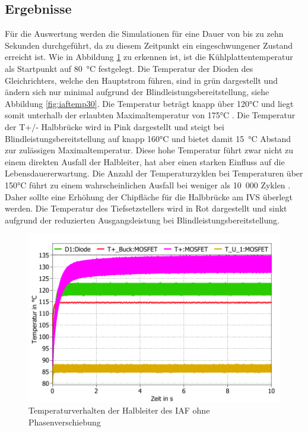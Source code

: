 		\subsection{Ergebnisse}
		Für die Auswertung werden die Simulationen für eine Dauer von bis zu zehn Sekunden durchgeführt, da zu diesem Zeitpunkt ein eingeschwungener Zustand erreicht ist. Wie in Abbildung \ref{fig:iaftemp0} zu erkennen ist, ist die Kühlplattentemperatur als Startpunkt auf 80~°C festgelegt. Die Temperatur der Dioden des Gleichrichters, welche den Hauptstrom führen, sind in grün dargestellt und ändern sich nur minimal aufgrund der Blindleistungsbereitstellung, siehe Abbildung \ref{fig:iaftemp30}. Die Temperatur beträgt knapp über 120°C und liegt somit unterhalb der erlaubten Maximaltemperatur von 175°C \cite{IFAGFF2}. Die Temperatur der T+/- Halbbrücke wird in Pink dargestellt und steigt bei Blindleistungsbereitstellung auf knapp 160°C und bietet damit 15~°C Abstand zur zulässigen Maximaltemperatur. Diese hohe Temperatur führt zwar nicht zu einem direkten Ausfall der Halbleiter, hat aber einen starken Einfluss auf die Lebensdauererwartung. Die Anzahl der Temperaturzyklen bei Temperaturen über 150°C führt zu einem wahrscheinlichen Ausfall bei weniger als 10~000 Zyklen \cite{SicTemp}. Daher sollte eine Erhöhung der Chipfläche für die Halbbrücke am \gls{IVS} überlegt werden. Die Temperatur des Tiefsetzstellers wird in Rot dargestellt und sinkt aufgrund der reduzierten Ausgangsleistung bei Blindleistungsbereitstellung.  
		\begin{figure} 
			\centering
			\includegraphics[width=0.9\linewidth]{content/Grafiken/IAF_Temp_0Grad}
			
			
			\caption{Temperaturverhalten der Halbleiter des IAF ohne Phasenverschiebung}
			\label{fig:iaftemp0}
		\end{figure}
		
